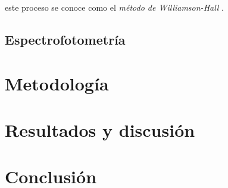 \documentclass[final,5p,times,twocolumn, nopreprintline]{elsarticle}
\numberwithin{equation}{section}
\begin{document}
este proceso se conoce como el \emph{método de Williamson-Hall} \cite{himabindu2021microstructural}.


\subsection{Espectrofotometría}

\section{Metodología}

\section{Resultados y discusión}

\section{Conclusión}

 

%
%






\end{document}
